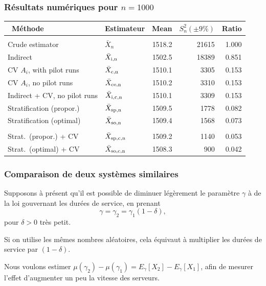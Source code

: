 \documentclass[t,usepdftitle=false]{beamer}
\begin{document}
\begin{frame}
	\frametitle{Résultats numériques pour $n = 1000$}
	
	\begin{small}
		\begin{tabular}{llrrr}
			\hline
			\ Méthode                & Estimateur
			& Mean   & $S_n^2 (\pm 9\%)$ & Ratio \\
			\hline
			&&&&\\
			Crude estimator             & $\bar X_n$
			& 1518.2 & 21615  &  1.000 \\
			Indirect                    & $\bar X_{\rm{i},n}$
			& 1502.5 & 18389  &  0.851 \\
			CV $A_i$, with pilot runs   & $\bar X_{\rm{c},n}$
			& 1510.1 &  3305  &  0.153 \\
			CV $A_i$, no pilot runs     & $\bar X_{\rm{c}e,n}$
			& 1510.2 &  3310  &  0.153 \\
			Indirect + CV, no pilot runs & $\bar X_{\rm{i},\rm{c},n}$
			& 1510.1 &  3309  &  0.153 \\
			Stratification (propor.)   & $\bar X_{\rm{s}p,n}$
			& 1509.5 &  1778  &  0.082 \\
			Stratification (optimal)    & $\bar X_{\rm{s}o,n}$
			& 1509.4 &  1568  &  0.073 \\
			&&&& \\
			Strat.\ (propor.) + CV & $\bar X_{\rm{s}p,\rm{c},n}$
			& 1509.2 &  1140  &  0.053 \\
			Strat.\ (optimal) + CV & $\bar X_{\rm{s}o,\rm{c},n}$
			& 1508.3 &   900  &  0.042 \\
			\hline
		\end{tabular}
	\end{small}
	
\end{frame}

\begin{frame}
	\frametitle{Comparaison de deux systèmes similaires}
	
	Supposons à présent qu'il est possible de diminuer légèrement le paramètre $\gamma$ à de la loi gouvernant les durées de service, en prenant
	\[
	\gamma = {\gamma_2} = \gamma_1(1-\delta),
	\]
	pour ${\delta} > 0$ très petit.
	
	\mbox{}
	
	Si on utilise les m\^emes nombres aléatoires, cela équivaut \`a multiplier
	les durées de service par $(1-\delta)$.
	
	\mbox{}
	
	Nous voulons estimer $\mu(\gamma_2) - \mu(\gamma_1) = E_\gamma[X_2] - E_\gamma[X_1]$,
	afin de mesurer l'effet d'augmenter un peu la vitesse des serveurs.
	
\end{frame}
\end{document}
